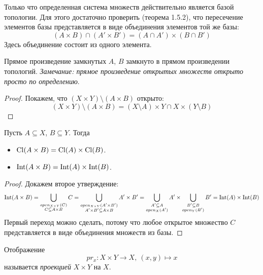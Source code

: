 \begin{lemma}
	Только что определенная система множеств действительно является базой топологии.
	Для этого достаточно проверить (теорема 1.5.2), что пересечение элементов базы
	представляется в виде объединения элементов той же базы:
\[
	(A \times B) \cap (A' \times B') = (A \cap A') \times (B \cap B')
\]
	Здесь объединение состоит из одного элемента.
\end{lemma}

\begin{theorem}
	Прямое произведение замкнутых $A$, $B$ замкнуто в прямом произведении топологий.
	\textit{Замечание: прямое произведение открытых множеств открыто просто по определению}.
\end{theorem}
\begin{proof}
	Покажем, что $(X \times Y) \setminus (A \times B)$ открыто:
\[
	(X \times Y) \setminus (A \times B) = (X \setminus A) \times Y \cap X \times (Y \setminus B)
\]
\end{proof}

\begin{remark}
	Пусть $A \subseteq X$, $B \subseteq Y$. Тогда
	\begin{itemize}
		\item $\operatorname{Cl}(A \times B) = \operatorname{Cl}(A) \times \operatorname{Cl}(B)$.
		\item $\operatorname{Int}(A \times B) = \operatorname{Int}(A) \times \operatorname{Int}(B)$.
	\end{itemize}
\end{remark}
\begin{proof}
	Докажем второе утверждение:
\[
	\operatorname{Int}(A \times B) = \bigcup_{\substack{open_{X\times Y}(C) \\ C \subseteq A \times B}}{C}
	= \bigcup_{\substack{open_{X \times Y}(A' \times B') \\ A'\times B' \subseteq A \times B}}
	{A' \times B'} = \bigcup_{\substack{A' \subseteq A \\ open_X(A')}}{A'}
	\times \bigcup_{\substack{B' \subseteq B \\ open_Y(B')}}{B'} = \operatorname{Int}(A) \times \operatorname{Int}(B)
\]
	Первый переход можно сделать, потому что любое открытое множество $C$ представляется
	в виде объединения множеств из базы.
\end{proof}

\begin{definition}
	Отображение
\[
	pr_x \colon X \times Y \to X,~ (x, y) \mapsto x
\]
	называется \textit{проекцией} $X \times Y$ на $X$.
\end{definition}

